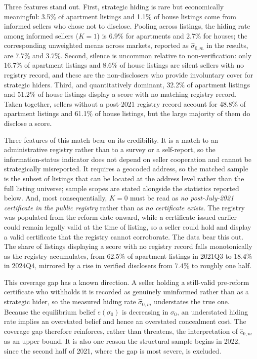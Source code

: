 \noindent Three features stand out. First, strategic hiding is rare but economically meaningful: 3.5\% of apartment listings and 1.1\% of house listings come from informed sellers who chose not to disclose. Pooling across listings, the hiding rate among informed sellers ($K=1$) is 6.9\% for apartments and 2.7\% for houses; the corresponding unweighted means across markets, reported as $\hat\sigma_{0,m}$ in the results, are 7.7\% and 3.7\%. Second, silence is uncommon relative to non-verification: only 16.7\% of apartment listings and 8.6\% of house listings are silent sellers with no registry record, and these are the non-disclosers who provide involuntary cover for strategic hiders. Third, and quantitatively dominant, 32.2\% of apartment listings and 51.2\% of house listings display a score with no matching registry record. Taken together, sellers without a post-2021 registry record account for 48.8\% of apartment listings and 61.1\% of house listings, but the large majority of them do disclose a score.

Three features of this match bear on its credibility. It is a match to an administrative registry
rather than to a survey or a self-report, so the information-status indicator does not depend on
seller cooperation and cannot be strategically misreported. It requires a geocoded address, so the
matched sample is the subset of listings that can be located at the address level rather than the
full listing universe; sample scopes are stated alongside the statistics reported below. And, most
consequentially, $K=0$ must be read as \emph{no post-July-2021 certificate in the public registry}
rather than as \emph{no certificate exists}. The registry was populated from the reform date
onward, while a certificate issued earlier could remain legally valid at the time of listing, so a
seller could hold and display a valid certificate that the registry cannot corroborate. The data
bear this out. The share of listings displaying a score with no registry record falls monotonically
as the registry accumulates, from $62.5\%$ of apartment listings in 2021Q3 to $18.4\%$ in 2024Q4,
mirrored by a rise in verified disclosers from $7.4\%$ to roughly one half.

This coverage gap has a known direction. A seller holding a still-valid pre-reform certificate who
withholds it is recorded as genuinely uninformed rather than as a strategic hider, so the measured
hiding rate $\hat\sigma_{0,m}$ understates the true one. Because the equilibrium belief
$e(\sigma_0)$ is decreasing in $\sigma_0$, an understated hiding rate implies an overstated belief
and hence an overstated concealment cost. The coverage gap therefore reinforces, rather than
threatens, the interpretation of $\hat c_{0,m}$ as an upper bound. It is also one reason the
structural sample begins in 2022, since the second half of 2021, where the gap is most severe, is
excluded.

